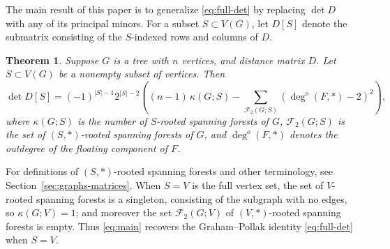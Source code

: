 \documentclass{amsart}
\newtheorem{thm}{Theorem}[section]
\theoremstyle{definition}
\newcommand{\forests}{\mathcal{F}}
\newcommand{\degout}{\deg^o}
\begin{document}
The main result of this paper is to generalize \eqref{eq:full-det} by replacing $\det D$ with any of its principal minors.
For a subset $S \subset V(G)$, let $D[S]$ denote the submatrix consisting of the $S$-indexed rows and columns of $D$.
\begin{thm}
\label{thm:main}
Suppose $G$ is a tree with $n$ vertices, 
and distance matrix $D$.
Let $S \subset V(G)$ be a nonempty subset of vertices.
Then
\begin{equation}\label{eq:main}
\det D[S] = (-1)^{|S|-1} 2^{|S|-2} \left( (n-1)\, \kappa(G;S)  - \sum_{\mathcal F_2(G;S)} \left(\degout(F,*) - 2\right)^2  \right),
\end{equation}
where 
$\kappa(G;S)$ is the number of $S$-rooted spanning forests of $G$,
$\forests_2(G;S)$ is the set of $(S,*)$-rooted spanning forests of $G$,
and
$\degout(F,*)$ denotes the outdegree of the floating component of $F$.
\end{thm}
For definitions of $(S,*)$-rooted spanning forests and other terminology, see Section~\ref{sec:graphs-matrices}.
When $S = V$ is the full vertex set, the set of $V$-rooted spanning forests is a singleton, consisting of the subgraph with no edges, 
so $\kappa(G; V) = 1$; and moreover the set $\forests_2(G; V)$ of $(V, *)$-rooted spanning forests is empty. 
Thus \eqref{eq:main} recovers the Graham--Pollak identity \eqref{eq:full-det} when $S = V$.
\end{document}
